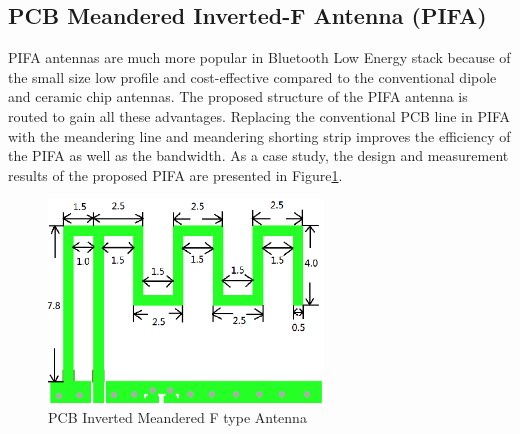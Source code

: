 \subsection{PCB Meandered Inverted-F Antenna (PIFA)}

PIFA antennas are much more popular in Bluetooth Low Energy stack because of the small size low profile and cost-effective compared to the conventional dipole and ceramic chip antennas.
The proposed structure of the PIFA antenna is routed to gain all these advantages.
Replacing the conventional PCB line in PIFA with the meandering line and meandering shorting strip
improves the efficiency of the PIFA as well as the bandwidth. As a case study, the design and measurement results of the
proposed PIFA are presented \cite{PIFA2017Cheuk} in Figure\ref{fig:PIFA_Antenna_1}.


\begin{figure}[ht]
	\centering
	\includegraphics[width=0.65\textwidth]{Chap03/Figures/MIFA_Antenna.PNG}
	\caption{PCB Inverted Meandered F type Antenna }
	\label{fig:PIFA_Antenna_1}
\end{figure}
